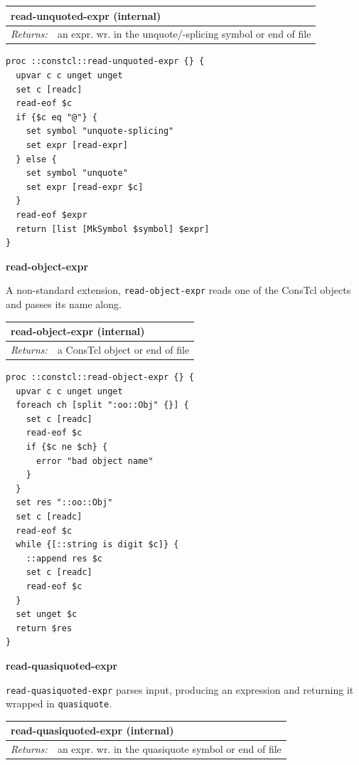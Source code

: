\documentclass[twoside,9pt]{report}
\begin{document}
\begin{tabular}{ |l l| }
\hline
\multicolumn{2}{|l|}{read-unquoted-expr (internal)} \\
\hline
\textit{Returns:} & an expr. wr. in the unquote/-splicing symbol or end of file \\
\hline
\end{tabular}

\noindent\makebox[\linewidth]{\rule{\linewidth}{0.4pt}}
\begin{lstlisting}
proc ::constcl::read-unquoted-expr {} {
  upvar c c unget unget
  set c [readc]
  read-eof $c
  if {$c eq "@"} {
    set symbol "unquote-splicing"
    set expr [read-expr]
  } else {
    set symbol "unquote"
    set expr [read-expr $c]
  }
  read-eof $expr
  return [list [MkSymbol $symbol] $expr]
}
\end{lstlisting}
\noindent\makebox[\linewidth]{\rule{\linewidth}{0.4pt}}

\textbf{read-object-expr}


A non-standard extension, \texttt{read-object-expr} reads one of the ConsTcl objects and passes its name along.

\begin{tabular}{ |l l| }
\hline
\multicolumn{2}{|l|}{read-object-expr (internal)} \\
\hline
\textit{Returns:} & a ConsTcl object or end of file \\
\hline
\end{tabular}

\noindent\makebox[\linewidth]{\rule{\linewidth}{0.4pt}}
\begin{lstlisting}
proc ::constcl::read-object-expr {} {
  upvar c c unget unget
  foreach ch [split ":oo::Obj" {}] {
    set c [readc]
    read-eof $c
    if {$c ne $ch} {
      error "bad object name"
    }
  }
  set res "::oo::Obj"
  set c [readc]
  read-eof $c
  while {[::string is digit $c]} {
    ::append res $c
    set c [readc]
    read-eof $c
  }
  set unget $c
  return $res
}
\end{lstlisting}
\noindent\makebox[\linewidth]{\rule{\linewidth}{0.4pt}}

\textbf{read-quasiquoted-expr}


\texttt{read-quasiquoted-expr} parses input, producing an expression and returning it wrapped in \texttt{quasiquote}.

\begin{tabular}{ |l l| }
\hline
\multicolumn{2}{|l|}{read-quasiquoted-expr (internal)} \\
\hline
\textit{Returns:} & an expr. wr. in the quasiquote symbol or end of file \\
\hline
\end{tabular}
\end{document}
